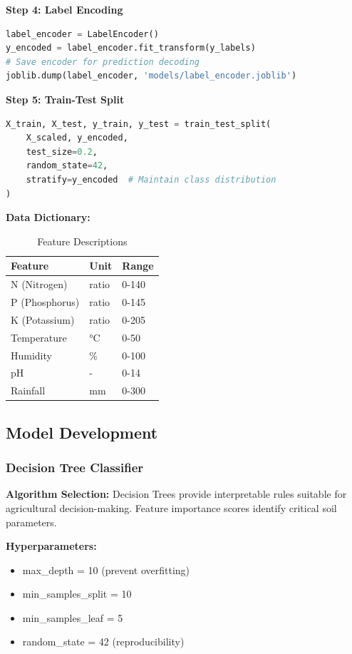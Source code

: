 \documentclass[conference]{IEEEtran}
\begin{document}
\textbf{Step 4: Label Encoding}
\begin{lstlisting}[language=Python, caption=Categorical Encoding]
label_encoder = LabelEncoder()
y_encoded = label_encoder.fit_transform(y_labels)
# Save encoder for prediction decoding
joblib.dump(label_encoder, 'models/label_encoder.joblib')
\end{lstlisting}

\textbf{Step 5: Train-Test Split}
\begin{lstlisting}[language=Python, caption=Stratified Splitting]
X_train, X_test, y_train, y_test = train_test_split(
    X_scaled, y_encoded, 
    test_size=0.2, 
    random_state=42,
    stratify=y_encoded  # Maintain class distribution
)
\end{lstlisting}

\textbf{Data Dictionary:}
\begin{table}[h]
\centering
\caption{Feature Descriptions}
\begin{tabular}{@{}lll@{}}
\toprule
\textbf{Feature} & \textbf{Unit} & \textbf{Range} \\ \midrule
N (Nitrogen) & ratio & 0-140 \\
P (Phosphorus) & ratio & 0-145 \\
K (Potassium) & ratio & 0-205 \\
Temperature & °C & 0-50 \\
Humidity & \% & 0-100 \\
pH & - & 0-14 \\
Rainfall & mm & 0-300 \\ \bottomrule
\end{tabular}
\label{tab:features}
\end{table}

\subsection{Model Development}

\subsubsection{Decision Tree Classifier}
\textbf{Algorithm Selection:} Decision Trees provide interpretable rules suitable for agricultural decision-making. Feature importance scores identify critical soil parameters.

\textbf{Hyperparameters:}
\begin{itemize}
    \item max\_depth = 10 (prevent overfitting)
    \item min\_samples\_split = 10
    \item min\_samples\_leaf = 5
    \item random\_state = 42 (reproducibility)
\end{itemize}
\end{document}
